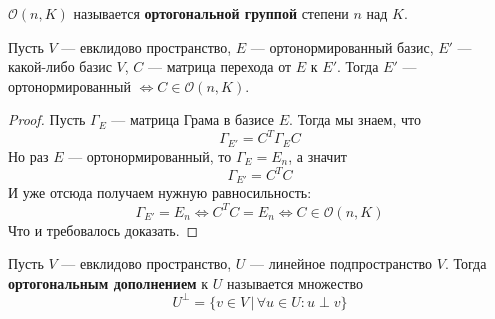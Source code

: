 \documentclass[../main.tex]{subfiles}
\begin{document}
\begin{definition}
  $\mathcal{O}(n, K)$ называется \textbf{ортогональной группой} степени $n$ над $K$.
\end{definition}

\begin{theorem-non}
  Пусть $V$ --- евклидово пространство, $E$ --- ортонормированный базис, $E'$ --- какой-либо базис $V$, $C$ --- матрица перехода от $E$ к $E'$. Тогда $E'$ --- ортонормированный $\iff C \in \mathcal{O}(n, K)$.
\end{theorem-non}
\begin{proof}
  Пусть $\Gamma_E$ --- матрица Грама в базисе $E$. Тогда мы знаем, что
  \begin{equation*}
    \Gamma_{E'} = C^T \Gamma_{E} C
  \end{equation*}
  Но раз $E$ --- ортонормированный, то $\Gamma_E = E_n$, а значит
  \begin{equation*}
    \Gamma_{E'} = C^T C
  \end{equation*}
  И уже отсюда получаем нужную равносильность:
  \begin{equation*}
    \Gamma_{E'} = E_n \iff C^TC = E_n \iff C \in \mathcal{O}(n, K)
  \end{equation*}
  Что и требовалось доказать.
\end{proof}

\begin{definition}
  Пусть $V$ --- евклидово пространство, $U$ --- линейное подпространство $V$. Тогда \textbf{ортогональным дополнением} к $U$ называется множество
  \begin{equation*}
    U^\perp = \{v \in V \, | \, \forall u \in U\colon u \perp v\}
  \end{equation*}
\end{definition}
\end{document}
